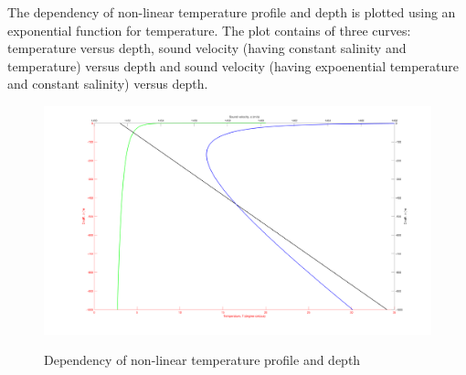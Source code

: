 \noindent The dependency of non-linear temperature profile and depth is plotted using an exponential function for temperature. The plot contains of three curves: temperature versus depth, sound velocity (having constant salinity and temperature) versus depth and sound velocity (having expoenential temperature and constant salinity) versus depth.

\begin{figure}[H]
\centering
{\includegraphics[scale=0.18]{nonlinear.png}}
\caption{Dependency of non-linear temperature profile and depth}
\end{figure}
